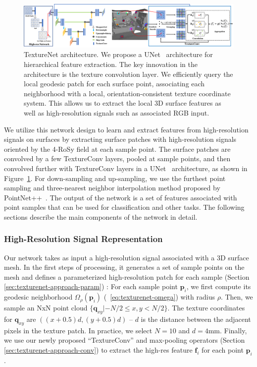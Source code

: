 \begin{figure}
\includegraphics[width=\linewidth]{texturenet/diagram/network.pdf}
\caption{TextureNet architecture. We propose a UNet~\cite{ronneberger2015u} architecture for hierarchical feature extraction. The key innovation in the architecture is the texture convolution layer. We efficiently query the local geodesic patch for each surface point, associating each neighborhood with a local, orientation-consistent texture coordinate system. This allows us to extract the local 3D surface features as well as high-resolution signals such as associated RGB input.}
\label{fig:texturenet-approach-network}
\end{figure}

We utilize this network design to learn and extract features from high-resolution signals on surfaces by extracting surface patches with high-resolution signals oriented by the 4-RoSy field at each sample point.   The surface patches are convolved by a few TextureConv layers, pooled at sample points, and then convolved further with TextureConv layers in a UNet~\cite{ronneberger2015u} architecture, as shown in Figure~\ref{fig:texturenet-approach-network}.  For down-sampling and up-sampling, we use the furthest point sampling and three-nearest neighbor interpolation method proposed by PointNet++~\cite{qi2017pointnet++}.  The output of the network is a set of features associated with point samples that can be used for classification and other tasks.   The following sections describe the main components of the network in detail.


\subsubsection{High-Resolution Signal Representation}
\label{sec:texturenet-high-res}
Our network takes as input a high-resolution signal associated with a 3D surface mesh. In the first steps of processing, it generates a set of sample points on the mesh and defines a parameterized high-resolution patch for each sample (Section \ref{sec:texturenet-approach-param}) : For each sample point $\mathbf{p}_i$, we first compute its geodesic neighborhood $\Omega_{\rho}(\mathbf{p}_i)$ (~\ref{eq:texturenet-omega}) with radius $\rho$. Then, we sample an NxN point cloud $\{\mathbf{q}_{xy}|-N/2\leq x,y<N/2\}$. The texture coordinates for $\mathbf{q}_{xy}$ are $((x+0.5)d,(y+0.5)d)$ -- $d$ is the distance between the adjacent pixels in the texture patch. In practice, we select $N=10$ and $d=4$mm. Finally, we use our newly proposed ``TextureConv'' and max-pooling operators (Section \ref{sec:texturenet-approach-conv}) to extract the high-res feature $\mathbf{f}_i$ for each point $\mathbf{p}_i$.  


